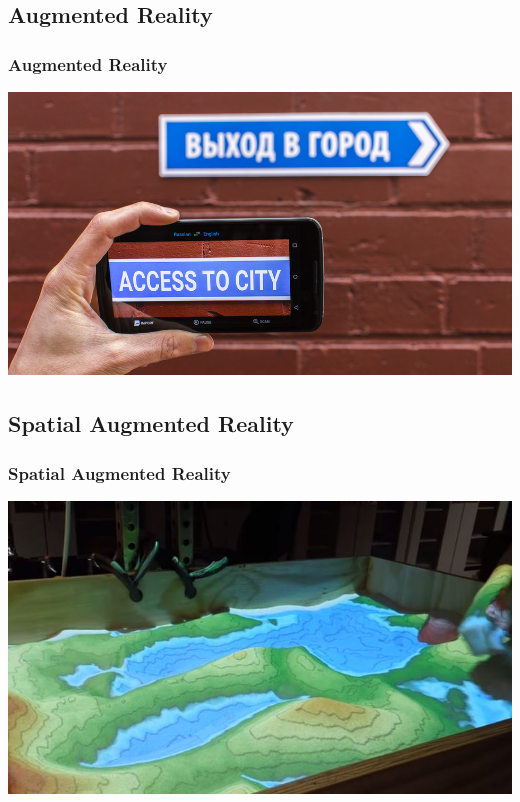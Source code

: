 \documentclass{beamer}
\begin{document}
\subsection{Augmented Reality}
\begin{frame}
	\frametitle{Augmented Reality}
	\includegraphics[width=\textwidth]{images/google-translate}
\end{frame}

\subsection{Spatial Augmented Reality}
\begin{frame}
	\frametitle{Spatial Augmented Reality}
	\includegraphics[width=\textwidth]{images/Augmented-Reality-Sandbox}
\end{frame}
\end{document}
